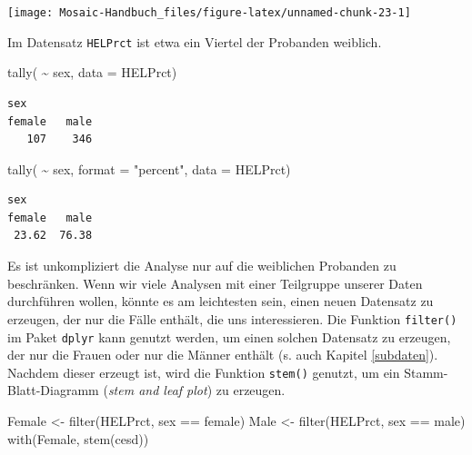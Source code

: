 \documentclass[
  ngerman,
]{scrbook}
\newenvironment{Shaded}{\begin{snugshade}}{\end{snugshade}}
\newcommand{\AttributeTok}[1]{\textcolor[rgb]{0.77,0.63,0.00}{#1}}
\newcommand{\FunctionTok}[1]{\textcolor[rgb]{0.00,0.00,0.00}{#1}}
\newcommand{\NormalTok}[1]{#1}
\newcommand{\OtherTok}[1]{\textcolor[rgb]{0.56,0.35,0.01}{#1}}
\newcommand{\SpecialCharTok}[1]{\textcolor[rgb]{0.00,0.00,0.00}{#1}}
\newcommand{\StringTok}[1]{\textcolor[rgb]{0.31,0.60,0.02}{#1}}
\begin{document}
\begin{center}\texttt{[image: Mosaic-Handbuch\_files/figure-latex/unnamed-chunk-23-1]} \end{center}

Im Datensatz \texttt{HELPrct} ist etwa ein Viertel der Probanden weiblich.

\begin{Shaded}
\begin{Highlighting}[]
\FunctionTok{tally}\NormalTok{( }\SpecialCharTok{\textasciitilde{}}\NormalTok{ sex, }\AttributeTok{data =}\NormalTok{ HELPrct)}
\end{Highlighting}
\end{Shaded}

\begin{verbatim}
sex
female   male 
   107    346 
\end{verbatim}

\begin{Shaded}
\begin{Highlighting}[]
\FunctionTok{tally}\NormalTok{( }\SpecialCharTok{\textasciitilde{}}\NormalTok{ sex, }\AttributeTok{format =} \StringTok{"percent"}\NormalTok{, }\AttributeTok{data =}\NormalTok{ HELPrct)}
\end{Highlighting}
\end{Shaded}

\begin{verbatim}
sex
female   male 
 23.62  76.38 
\end{verbatim}

Es ist unkompliziert die Analyse nur auf die weiblichen Probanden zu beschränken. Wenn wir viele Analysen mit einer Teilgruppe unserer Daten durchführen wollen, könnte es am leichtesten sein, einen neuen Datensatz zu erzeugen, der nur die Fälle enthält, die uns interessieren. Die Funktion \texttt{filter()} im Paket \texttt{dplyr} kann genutzt werden, um einen solchen Datensatz zu erzeugen, der nur die Frauen oder nur die Männer enthält (s. auch Kapitel \ref{subdaten}). Nachdem dieser erzeugt ist, wird die Funktion \texttt{stem()} genutzt, um ein Stamm-Blatt-Diagramm (\emph{stem and leaf plot}) zu erzeugen.

\begin{Shaded}
\begin{Highlighting}[]
\NormalTok{Female }\OtherTok{\textless{}{-}} \FunctionTok{filter}\NormalTok{(HELPrct, sex }\SpecialCharTok{==} \StringTok{\textquotesingle{}female\textquotesingle{}}\NormalTok{)}
\NormalTok{Male }\OtherTok{\textless{}{-}} \FunctionTok{filter}\NormalTok{(HELPrct, sex }\SpecialCharTok{==} \StringTok{\textquotesingle{}male\textquotesingle{}}\NormalTok{)}
\FunctionTok{with}\NormalTok{(Female, }\FunctionTok{stem}\NormalTok{(cesd))}
\end{Highlighting}
\end{Shaded}
\end{document}
